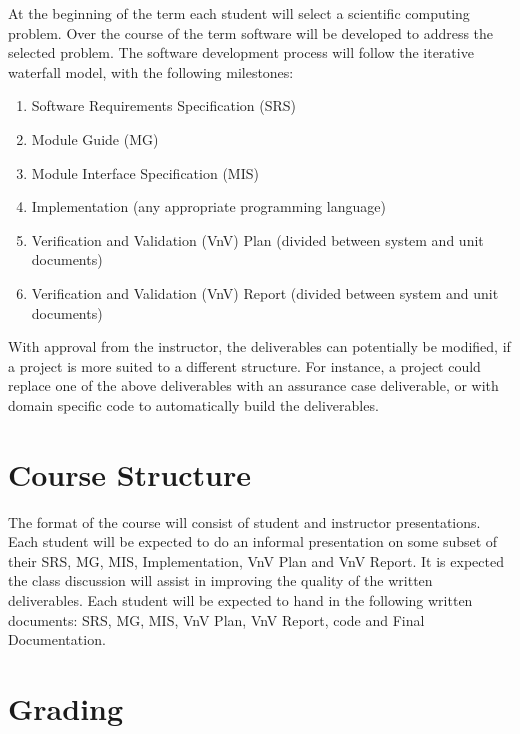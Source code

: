\documentclass[12pt]{article}
\begin{document}
At the beginning of the term each student will select a scientific computing
problem.  Over the course of the term software will be developed to address the
selected problem.  The software development process will follow the iterative
waterfall model, with the following milestones:

\begin {enumerate}

\item Software Requirements Specification (SRS)
\item Module Guide (MG)
\item Module Interface Specification (MIS)
\item Implementation (any appropriate programming language)
\item Verification and Validation (VnV) Plan (divided between system and unit documents)
\item Verification and Validation (VnV) Report (divided between system and unit documents) 

\end {enumerate}

With approval from the instructor, the deliverables can potentially be modified,
if a project is more suited to a different structure.  For instance, a project
could replace one of the above deliverables with an assurance case deliverable,
or with domain specific code to automatically build the deliverables.

\section {Course Structure}

The format of the course will consist of student and instructor presentations.
Each student will be expected to do an informal presentation on some subset of their SRS, MG,
MIS, Implementation, VnV Plan and VnV Report.  It is expected the class discussion will
assist in improving the quality of the written deliverables.  Each student will
be expected to hand in the following written documents: SRS, MG, MIS, VnV Plan,
VnV Report, code and Final Documentation.

\section {Grading}
\end{document}
